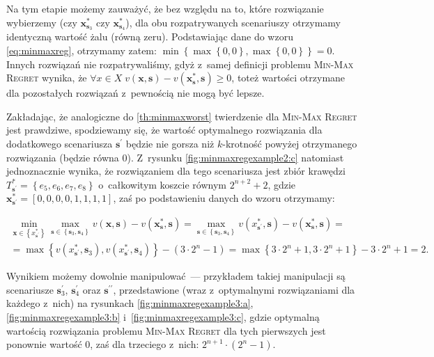 Na tym etapie możemy zauważyć, że bez względu na to, które rozwiązanie wybierzemy (czy $\textbf{x}^{\ast}_{\textbf{s}_{3}}$ czy $\textbf{x}^{\ast}_{\textbf{s}_{4}}$), dla obu rozpatrywanych scenariuszy otrzymamy identyczną wartość żalu (równą zeru).
Podstawiając dane do wzoru \ref{eq:minmaxreg}, otrzymamy zatem: $\min \left\{ \max \left\{ 0, 0 \right\} , \max \left\{ 0, 0 \right\} \right\} = 0$.
Innych rozwiązań nie rozpatrywaliśmy, gdyż z~samej definicji problemu \textsc{Min-Max Regret} wynika, że $\forall x \in X \; v \left( \textbf{x}, \textbf{s} \right) - v \left( \textbf{x}^{\ast}_{\textbf{s}}, \textbf{s} \right) \geqslant 0$, toteż wartości otrzymane dla pozostałych rozwiązań z~pewnością nie mogą być lepsze.

Zakładając, że analogiczne do \ref{th:minmaxworst} twierdzenie dla \textsc{Min-Max Regret} jest prawdziwe, spodziewamy się, że wartość optymalnego rozwiązania dla dodatkowego scenariusza $\textbf{s}^{\prime}$ będzie nie gorsza niż $k$-krotność powyżej otrzymanego rozwiązania (będzie równa $0$).
Z~rysunku \ref{fig:minmaxregexample2:c} natomiast jednoznacznie wynika, że rozwiązaniem dla tego scenariusza jest zbiór krawędzi $T^{\ast}_{\textbf{s}^{\prime}} = \left\{ e_{5}, e_{6}, e_{7}, e_{8} \right\}$ o~całkowitym koszcie równym $2^{n+2} + 2$, gdzie $\textbf{x}^{\ast}_{\textbf{s}^{\prime}} = \left[ 0, 0, 0, 0, 1, 1, 1, 1 \right]$, zaś po podstawieniu danych do wzoru otrzymamy:

\begin{gather*}
	\min_{\textbf{x} \in \left\{ x^{\ast}_{\textbf{s}^{\prime}} \right\}} \max_{\textbf{s} \in \left\{ \textbf{s}_{3}, \textbf{s}_{4} \right\}} v \left( \textbf{x}, \textbf{s} \right) - v \left( \textbf{x}^{\ast}_{\textbf{s}}, \textbf{s} \right) = \max_{\textbf{s} \in \left\{ \textbf{s}_{3}, \textbf{s}_{4} \right\}} v \left( x^{\ast}_{\textbf{s}^{\prime}}, \textbf{s} \right) - v \left( \textbf{x}^{\ast}_{\textbf{s}}, \textbf{s} \right) = \\ 
	= \max \left\{ v \left( x^{\ast}_{\textbf{s}^{\prime}}, \textbf{s}_{3} \right), v \left( x^{\ast}_{\textbf{s}^{\prime}}, \textbf{s}_{4} \right) \right\} - \left( 3 \cdot 2^{n} - 1 \right) = \max \left\{ 3 \cdot 2^{n} + 1, 3 \cdot 2^{n} + 1 \right\} - 3 \cdot 2^{n} + 1 = 2\text{.}
\end{gather*}

Wynikiem możemy dowolnie manipulować~--- przykładem takiej manipulacji są scenariusze $\textbf{s}^{\prime}_{3}$, $\textbf{s}^{\prime}_{4}$ oraz $\textbf{s}^{\prime\prime}$, przedstawione (wraz z~optymalnymi rozwiązaniami dla każdego z~nich) na rysunkach \ref{fig:minmaxregexample3:a}, \ref{fig:minmaxregexample3:b} i~\ref{fig:minmaxregexample3:c}, gdzie optymalną wartością rozwiązania problemu \textsc{Min-Max Regret} dla tych pierwszych jest ponownie wartość $0$, zaś dla trzeciego z~nich: $2^{n+1} \cdot \left( 2^{n} - 1\right)$.

